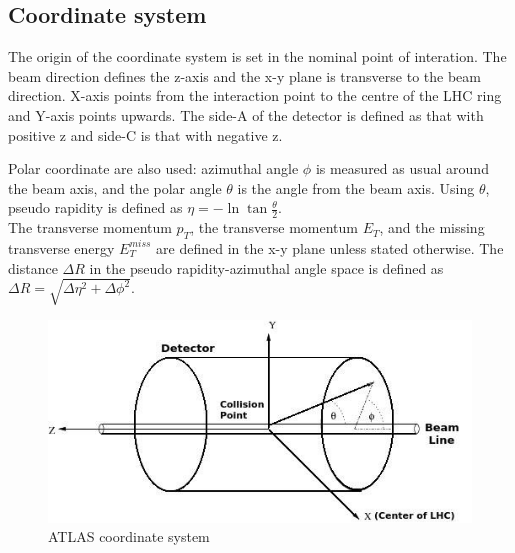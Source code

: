 \documentclass[a4paper, oneside, 11pt, openright]{book}
\begin{document}
				\subsection{Coordinate system}
					The origin of the coordinate system is set in the nominal point of interation. The beam direction defines the z-axis and the x-y plane is transverse to the beam direction. X-axis points from the interaction point to the centre of the LHC ring and Y-axis points upwards. The side-A of the detector is defined as that with positive z and side-C is that with negative z.
					
					Polar coordinate are also used: azimuthal angle $\phi$ is measured as usual around the beam axis, and the polar angle $\theta$ is the angle from the beam axis. Using $\theta$, pseudo rapidity is defined as $\eta= -\ln{\tan{\frac{\theta}{2}}}$. \\
					The transverse momentum $p_T$, the transverse momentum $E_T$, and the missing transverse energy $E_T^{miss}$ are defined in the x-y plane unless stated otherwise.  The distance $\Delta R$ in the pseudo rapidity-azimuthal angle space is defined as $\Delta R = \sqrt{\Delta \eta^2 + \Delta \phi^2 }$.
					\begin{figure}[H]
						\centering
						\includegraphics[width=0.3\textheight]{tesi_images/atlas_coord.jpeg}
						\caption{ATLAS coordinate system}
					\end{figure}
\end{document}
